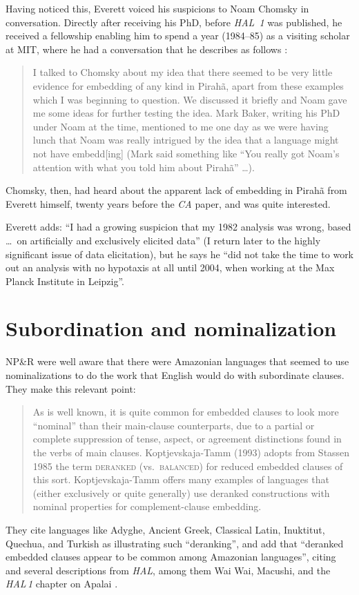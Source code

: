 \documentclass[output=paper,colorlinks,citecolor=brown
]{langscibook}
\begin{document}
Having noticed this, Everett voiced his suspicions to Noam Chomsky in
conversation. Directly after receiving his PhD, before \textit{HAL~1}
was published, he received a fellowship enabling him to spend a year
(1984--85) as a visiting scholar at MIT, where he had a conversation
that he describes as follows \citep[12, fn.\,7]{Everett07}:
\begin{quote}
I talked to Chomsky about my idea that there seemed to be very
little evidence for embedding of any kind in Pirahã, apart from
these \mbox{} examples which I was beginning to question.
We discussed it briefly and Noam gave me some ideas for further
testing the idea. Mark Baker, writing his PhD under Noam at
the time, mentioned to me one day as we were having lunch that Noam
was really intrigued by the idea that a language might not have
embedd[ing] (Mark said something like ``You really got Noam's
attention with what you told him about Pirah{\~a}'' \ldots).
\end{quote}
Chomsky, then, had heard about the apparent lack of embedding in
Pirah{\~a} from Everett himself, twenty years before the \textit{CA}
paper, and was quite interested.

Everett adds: ``I had a growing suspicion that my 1982 analysis was
wrong, based \ldots\ on artificially and exclusively elicited data''
(I return later to the highly significant issue of data elicitation),
but he says he ``did not take the time to work out an analysis with
no hypotaxis at all until 2004, when working at the Max Planck
Institute in Leipzig''.

\section{Subordination and nominalization}

NP\&R were well aware that there were Amazonian languages that seemed
to use nominalizations to do the work that English would do with
subordinate clauses. They make this relevant point:
\begin{quote}
As is well known, it is quite common for embedded clauses to look
more ``nominal'' than their main-clause counterparts, due to a partial
or complete suppression of tense, aspect, or agreement distinctions
found in the verbs of main clauses. Koptjevskaja-Tamm (1993) adopts
from Stassen 1985 the term \textsc{deranked} (vs.\ \textsc{balanced})
for reduced embedded clauses of this sort. Koptjevskaja-Tamm offers
many examples of languages that (either exclusively or quite generally)
use deranked constructions with nominal properties for complement-clause
embedding.
\citep[370]{NevPesRod09a}
\end{quote}
They cite languages like Adyghe, Ancient Greek, Classical Latin, Inuktitut,
Quechua, and Turkish as illustrating such ``deranking'', and add that
``deranked embedded clauses appear to be common among Amazonian languages'',
citing \citet{Derbyshire87} and several descriptions from \textit{HAL},
among them Wai Wai, Macushi, and the \textit{HAL\,1} chapter on Apalai
\citep{Koehn86}.
\end{document}

